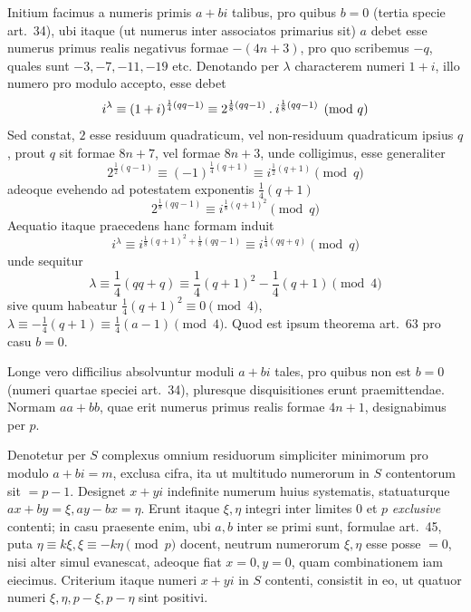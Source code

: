 Initium facimus a numeris primis $a+bi$ talibus, pro quibus $b=0$ (tertia specie art.~34), ubi itaque (ut numerus inter associatos primarius sit) $a$ debet esse numerus primus realis negativus formae $-(4n+3)$, pro quo scribemus $-q$, quales sunt $-3,-7,-11,-19$ etc. Denotando per $\lambda$ characterem numeri $1+i$, illo numero pro modulo accepto, esse debet
\[
i^\lambda\equiv(1+i)^{\frac14(qq-1)}\equiv2^{\frac18(qq-1)}\mathbin{.} i^{\frac18(qq-1)}\pmod q
\]
Sed constat, $2$ esse residuum quadraticum, vel non-residuum quadraticum ipsius $q$, prout $q$ sit formae $8n+7$, vel formae $8n+3$, unde colligimus, esse generaliter
\[
2^{\frac12(q-1)}\equiv(-1)^{\frac14(q+1)}\equiv i^{\frac12(q+1)}\pmod q
\]
adeoque evehendo ad potestatem exponentis $\frac14(q+1)$
\[
2^{\frac18(qq-1)}\equiv i^{\frac18(q+1)^2}\pmod q
\]
Aequatio itaque praecedens hanc formam induit
\[
i^\lambda\equiv i^{\frac18(q+1)^2+\frac18(qq-1)}\equiv i^{\frac14(qq+q)}\pmod q
\]
unde sequitur
\[
\lambda\equiv\frac14(qq+q)\equiv\frac14(q+1)^2-\frac14(q+1)\pmod4
\]
sive quum habeatur $\frac14(q+1)^2\equiv0\pmod4$, $\lambda\equiv-\frac14(q+1)\equiv\frac14(a-1)\pmod4$. Quod est ipsum theorema art.~63 pro casu $b=0$.

%
Longe vero difficilius absolvuntur moduli $a+bi$ tales, pro quibus non est $b=0$ (numeri quartae speciei art.~34), pluresque disquisitiones erunt praemittendae. Normam $aa+bb$, quae erit numerus primus realis formae $4n+1$, designabimus per $p$.

Denotetur per $S$ complexus omnium residuorum simpliciter minimorum pro modulo $a+bi=m$, exclusa cifra, ita ut multitudo numerorum in $S$ contentorum sit $=p-1$. Designet $x+yi$ indefinite numerum huius systematis, statuaturque $ax+by=\xi,ay-bx=\eta$. Erunt itaque $\xi,\eta$ integri inter limites $0$ et $p$ \emph{exclusive} contenti; in casu praesente enim, ubi $a,b$ inter se primi sunt, formulae art.~45, puta $\eta\equiv k\xi,\xi\equiv-k\eta\pmod p$ docent, neutrum numerorum $\xi,\eta$ esse posse $=0$, nisi alter simul evanescat, adeoque fiat $x=0,y=0$, quam combinationem iam eiecimus. Criterium itaque numeri $x+yi$ in $S$ contenti, consistit in eo, ut quatuor numeri $\xi,\eta,p-\xi,p-\eta$ sint positivi.

